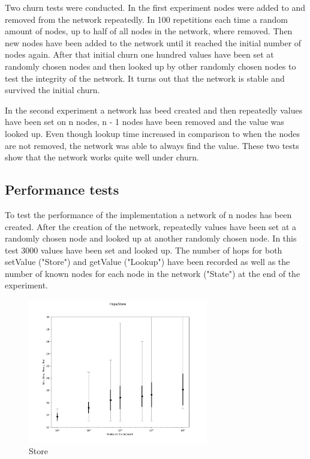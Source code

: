 \documentclass[a4paper, 12pt]{article} %
\begin{document}
Two churn tests were conducted. In the first experiment nodes were added to and removed from the network repeatedly. In 100 repetitions each time a random amount of nodes, up to half of all nodes in the network, where removed. Then new nodes have been added to the network until it reached the initial number of nodes again.  After that initial churn one hundred values have been set at randomly chosen nodes and then looked up by other randomly chosen nodes to test the integrity of the network. It turns out that the network is stable and survived the initial churn.

In the second experiment a network has beed created and then repeatedly values have been set on n nodes, n - 1 nodes have been removed and the value was looked up. Even though lookup time increased in comparison to when the nodes are not removed, the network was able to always find the value. These two tests show that the network works quite well under churn.

\subsection{Performance tests}

To test the performance of the implementation a network of n nodes has been created. After the creation of the network, repeatedly values have been set at a randomly chosen node and looked up at another randomly chosen node. In this test 3000 values have been set and looked up. The number of hops for both setValue ("Store") and getValue ("Lookup") have been recorded as well as the number of known nodes for each node in the network ("State") at the end of the experiment.

\begin{figure}[ht]
    \caption{Store}
    \centering
    \includegraphics[width=0.70\textwidth]{images/set_figure.png}
\end{figure}
\end{document}
